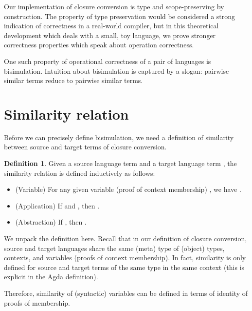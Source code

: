 \documentclass[bsc,frontabs,twoside,singlespacing,parskip,deptreport]{infthesis}
\theoremstyle{definition}
\newtheorem*{definition}{Definition}
\begin{document}
Our implementation of closure conversion is type and scope-preserving
by construction. The property of type preservation would be considered
a strong indication of correctness in a real-world compiler, but in
this theoretical development which deals with a small, toy language,
we prove stronger correctness properties which speak about operation
correctness.

One such property of operational correctness of a pair of languages is
bisimulation. Intuition about bisimulation is captured by a slogan:
pairwise similar terms reduce to pairwise similar terms. 

\section{Similarity relation}

Before we can precisely define
bisimulation, we need a definition of similarity between source
and target terms of closure conversion.


\begin{definition}
  Given a source language term  and a target language term ,
  the similarity relation  is defined inductively as
  follows:

  \begin{itemize}
  \item
    (Variable) For any given variable (proof of context membership) , we have
    .

  \item
    (Application) If  and ,
    then .

  \item
    (Abstraction) If ,
    then .
  \end{itemize}
\end{definition}

We unpack the definition here. Recall that in our definition of
closure conversion, source and target languages share the same (meta)
type of (object) types, contexts, and variables (proofs of context
membership). In fact, similarity is only defined for source and target
terms of the same type in the same context (this is explicit in the Agda
definition). 

Therefore, similarity of (syntactic) variables can be defined in terms
of identity of proofs of membership.
\end{document}
